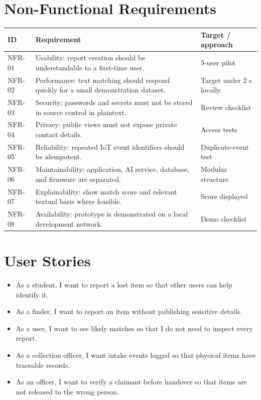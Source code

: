 \documentclass[12pt,a4paper]{report}
\begin{document}
\section{Non-Functional Requirements}
\begin{longtable}{p{}p{}p{}}
\toprule
ID & Requirement & Target / approach\\\midrule
NFR-01 & Usability: report creation should be understandable to a first-time user. & 5-user pilot\\
NFR-02 & Performance: text matching should respond quickly for a small demonstration dataset. & Target under 2 s locally\\
NFR-03 & Security: passwords and secrets must not be stored in source control in plaintext. & Review checklist\\
NFR-04 & Privacy: public views must not expose private contact details. & Access tests\\
NFR-05 & Reliability: repeated IoT event identifiers should be idempotent. & Duplicate-event test\\
NFR-06 & Maintainability: application, AI service, database, and firmware are separated. & Modular structure\\
NFR-07 & Explainability: show match score and relevant textual basis where feasible. & Score displayed\\
NFR-08 & Availability: prototype is demonstrated on a local development network. & Demo checklist\\
\bottomrule
\end{longtable}

\section{User Stories}
\begin{itemize}
\item As a student, I want to report a lost item so that other users can help identify it.
\item As a finder, I want to report an item without publishing sensitive details.
\item As a user, I want to see likely matches so that I do not need to inspect every report.
\item As a collection officer, I want intake events logged so that physical items have traceable records.
\item As an officer, I want to verify a claimant before handover so that items are not released to the wrong person.
\end{itemize}
\end{document}

